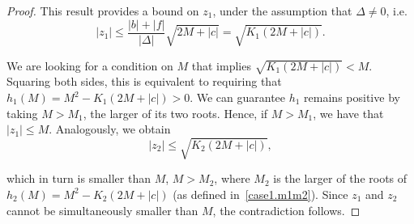 \documentclass[10pt,a4paper]{amsart}
\begin{document}
\begin{proof}
This result provides a bound on $z_1$, under the assumption that $\Delta \ne 0$, i.e.
\begin{equation} \label{ineq_z1}
|z_1| \leq \frac{|b| + |f|}{|\Delta|} \sqrt{2 M + |c|} = \sqrt{K_1 (2 M + |c|)}.
\end{equation}

We are looking for a condition on $M$ that implies
$\sqrt{K_1 (2 M + |c|)} < M$. Squaring both sides, this is equivalent to requiring that $h_1(M) = M^2 - K_1 (2 M +|c|) > 0$. We can guarantee $h_1$ remains positive by taking $M > M_1$, the larger of its two roots. Hence, if $M>M_1$, we have that $|z_1| \leq M$. Analogously, we obtain
\begin{equation*}
   |z_2| \leq \sqrt{K_2 (2 M + |c|)},
\end{equation*}

which in turn is smaller than $M$, $M > M_2$, where $M_2$ is the larger of the roots of $h_2(M) = M^2 - K_2 (2 M + |c|)$ (as defined in~\eqref{case1.m1m2}). Since $z_1$ and $z_2$ cannot be simultaneously smaller than $M$, the contradiction follows.
\end{proof}
\end{document}
